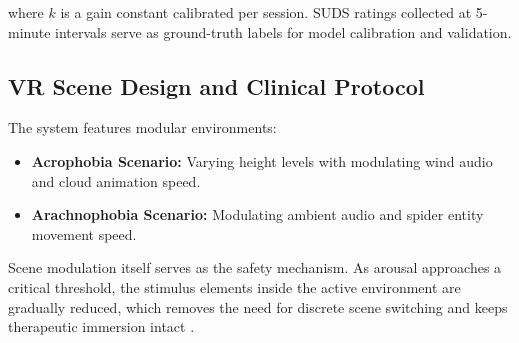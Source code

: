 \documentclass[conference]{IEEEtran}
\begin{document}
where $k$ is a gain constant calibrated per session. SUDS ratings collected at 5-minute intervals serve as ground-truth labels for model calibration and validation.

\subsection{VR Scene Design and Clinical Protocol}

The system features modular environments:

\begin{itemize}
    \item \textbf{Acrophobia Scenario:} Varying height levels with modulating wind audio and cloud animation speed.
    \item \textbf{Arachnophobia Scenario:} Modulating ambient audio and spider entity movement speed.
\end{itemize}

Scene modulation itself serves as the safety mechanism. As arousal approaches a critical threshold, the stimulus elements inside the active environment are gradually reduced, which removes the need for discrete scene switching and keeps therapeutic immersion intact \cite{chiossi2024,leong2025}.
\end{document}
